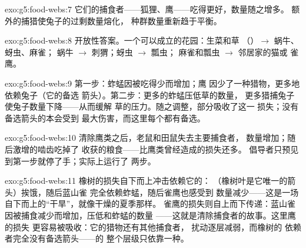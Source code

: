 \begin{solution}{exo:g5:food-webs:7}
它们的捕食者——狐狸、鹰——吃得更好，数量随之增多。
额外的捕猎使兔子的过剩数量熔化，
种群数量重新趋于平衡。
\end{solution}

\begin{solution}{exo:g5:food-webs:8}
开放性答案。一个可以成立的花园：生菜和草
（）$\rightarrow$ 蜗牛、蚜虫、麻雀；
蜗牛 $\rightarrow$ 刺猬；蚜虫 $\rightarrow$ 瓢虫；
麻雀和瓢虫 $\rightarrow$ 邻居家的猫或
雀鹰。
\end{solution}

\begin{solution}{exo:g5:food-webs:9}
第一步：蚱蜢因被吃得少而增加；鹰
因少了一种猎物，更多地依赖兔子（它的备选
箭头）。第二步：更多的蚱蜢压低草的数量，
更多猎捕兔子使兔子数量下降——从而缓解
草的压力。随之调整，部分吸收了这一
损失；没有备选箭头的本会受到
最大伤害，而这里每个都有备选。
\end{solution}

\begin{solution}{exo:g5:food-webs:10}
清除鹰类之后，老鼠和田鼠失去主要捕食者，
数量增加；随后激增的啮齿吃掉了
收获的粮食——比鹰类曾经造成的损失还多。
倡导者只预见到第一步就停了手；实际上运行了
两步。
\end{solution}

\begin{solution}{exo:g5:food-webs:11}
橡树的损失自下而上冲击依赖它的：
（橡树叶是它唯一的箭头）挨饿，随后蓝山雀
完全依赖蚱蜢，随后雀鹰也感受到
数量减少——这是一场自下而上的“干旱”，就像干燥的夏季那样。
雀鹰的损失则自上而下传递：蓝山雀
因被捕食减少而增加，压低和蚱蜢的数量
——这就是清除捕食者的故事。这里鹰的损失
更容易被吸收：它的猎物还有其他捕食者，
扰动逐层减弱，而橡树的
依赖者完全没有备选箭头——的
整个层级只依靠一种。
\end{solution}

